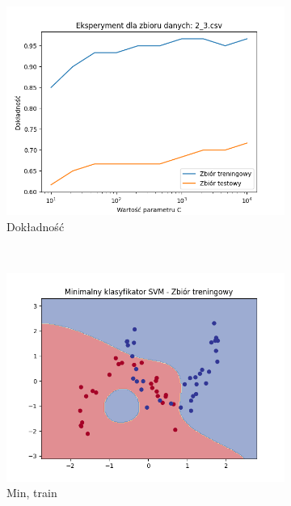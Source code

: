 \documentclass[12pt]{article}
\newcommand*{\subfigwidth}{0.24\textwidth}
\begin{document}
\begin{figure}[H]\centering
    \begin{subfigure}[t]{\subfigwidth}
        \includegraphics[width=\linewidth]{img/exp_3/svm/2_3/accuracy.png}
        \caption{Dokładność}
    \end{subfigure}
    \\
    \begin{subfigure}[t]{\subfigwidth}
        \includegraphics[width=\linewidth]{img/exp_3/svm/2_3/min/train_boundary.png}
        \caption{Min, train}
    \end{subfigure}
    \hfill
    \begin{subfigure}[t]{\subfigwidth}

\end{subfigure}
\end{figure}
\end{document}
